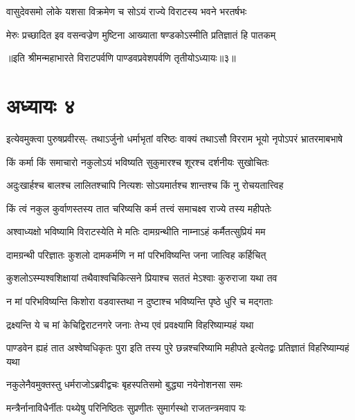 


\twolineshloka
{वासुदेवसमो लोके यशसा विक्रमेण च}
{सोऽयं राज्ये विराटस्य भवने भरतर्षभः}


\twolineshloka
{मेरुः प्रच्छादित इव वसन्वज्रेण मुष्टिना}
{आख्याता षण्डकोऽस्मीति प्रतिज्ञातं हि पातकम्}

॥इति श्रीमन्महाभारते विराटपर्वणि पाण्डवप्रवेशपर्वणि तृतीयोऽध्यायः॥३॥

\chapter{अध्यायः ४}

\fourlineindentedshloka
{इत्येवमुक्त्वा पुरुषप्रवीरस्-}
{तथाऽर्जुनो धर्माभृतां वरिष्ठः}
{वाक्यं तथाऽसौ विरराम भूयो}
{नृपोऽपरं भ्रातरमाबभाषे}


\twolineshloka
{किं कर्मा किं समाचारो नकुलोऽयं भविष्यति}
{सुकुमारश्च शूरश्च दर्शनीयः सुखोचितः}


\twolineshloka
{अदुःखार्हश्च बालश्च लालितश्चापि नित्यशः}
{सोऽयमार्तश्च शान्तश्च किं नु रोचयतात्त्विह}


\twolineshloka
{किं त्वं नकुल कुर्वाणस्तस्य तात चरिष्यसि}
{कर्म तत्त्वं समाचक्ष्व राज्ये तस्य महीपतेः}




\twolineshloka
{अश्वाध्यक्षो भविष्यामि विराटस्येति मे मतिः}
{दामग्रन्थीति नाम्नाऽहं कर्मैतत्सुप्रियं मम}


\twolineshloka
{दामग्रन्थी परिज्ञातः कुशलो दामकर्मणि}
{न मां परिभविष्यन्ति जना जात्विह कर्हिचित्}


\twolineshloka
{कुशलोऽस्म्यश्वशिक्षायां तथैवाश्वचिकित्सने}
{प्रियाश्च सततं मेऽश्वाः कुरुराजा यथा तव}


\twolineshloka
{न मां परिभविष्यन्ति किशोरा वडवास्तथा}
{न दुष्टाश्च भविष्यन्ति पृष्ठे धुरि च मद्गताः}


\twolineshloka
{द्रक्ष्यन्ति ये च मां केचिद्विराटनगरे जनाः}
{तेभ्य एवं प्रवक्ष्यामि विहरिष्याम्यहं यथा}


\threelineshloka
{पाण्डवेन ह्यहं तात अश्वेष्वधिकृतः पुरा}
{इति तस्य पुरे छन्नश्चरिष्यामि महीपते}
{इत्येतद्वः प्रतिज्ञातं विहरिष्याम्यहं यथा}



\twolineshloka
{नकुलेनैवमुक्तस्तु धर्मराजोऽब्रवीद्वचः}
{बृहस्पतिसमो बुद्ध्या नयेनोशनसा समः}


\twolineshloka
{मन्त्रैर्नानाविधैर्नीतः पथ्येषु परिनिष्ठितः}
{सुप्रणीतः सुमार्गस्थो राजतन्त्रमवाप यः}


